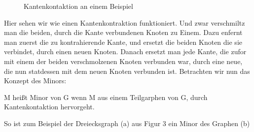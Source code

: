 \documentclass[runningheads]{llncs}
\begin{document}
\begin{figure}
    \begin{subfigure}{.24\textwidth}
        \centering
    \end{subfigure}
    \caption{Kantenkontaktion an einem Beispiel}
\end{figure}

Hier sehen wir wie einen Kantenkontraktion funktioniert. Und zwar verschmiltz man die beiden, durch die Kante 
verbundenen Knoten zu Einem. Dazu enfernt man zuerst die zu kontrahierende Kante, und ersetzt die beiden Knoten die sie 
verbindet, durch einen neuen Knoten. Danach ersetzt man jede Kante, die zufor mit einem der beiden verschmolzenen Knoten 
verbunden war, durch eine neue, die nun statdessen mit dem neuen Knoten verbunden ist. Betrachten wir nun das Konzept des
Minors:
\begin{definition}[Minor]
    M heißt Minor von G wenn M aus einem Teilgarphen von G, durch Kantenkontaktion hervorgeht.
\end{definition}
So ist zum Beispiel der Dreiecksgraph (a) aus Figur 3 ein Minor des Graphen (b)
\end{document}
